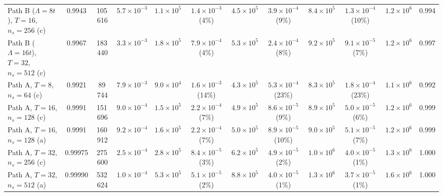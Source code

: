 \documentclass[a4paper,11pt,noarxiv]{quantumarticle}
\begin{document}
\begin{table}[t]
{\begin{tabular}{lcc|cc|cc|cc|ccc}
  Path B ($\Lambda=8t$), $T=16$, $n_s=256$ (c) & 0.9943 & 105\,616 & $5.7{\times}10^{-3}$ & $1.1{\times}10^{5}$ & $1.4{\times}10^{-3}$ (4\%) & $4.5{\times}10^{5}$ & $3.9{\times}10^{-4}$ (9\%) & $8.4{\times}10^{5}$ & $1.3{\times}10^{-4}$ (10\%) & $1.2{\times}10^{6}$ & 0.994\\
  Path B ($\Lambda=16t$), $T=32$, $n_s=512$ (c) & 0.9967 & 183\,440 & $3.3{\times}10^{-3}$ & $1.8{\times}10^{5}$ & $7.9{\times}10^{-4}$ (4\%) & $5.3{\times}10^{5}$ & $2.4{\times}10^{-4}$ (8\%) & $9.2{\times}10^{5}$ & $9.1{\times}10^{-5}$ (7\%) & $1.2{\times}10^{6}$ & 0.997\\
  Path A, $T=8$, $n_s=64$ (c) & 0.9921 & 89\,744 & $7.9{\times}10^{-3}$ & $9.0{\times}10^{4}$ & $1.6{\times}10^{-3}$ (14\%) & $4.3{\times}10^{5}$ & $5.3{\times}10^{-4}$ (23\%) & $8.3{\times}10^{5}$ & $1.8{\times}10^{-4}$ (23\%) & $1.1{\times}10^{6}$ & 0.992\\
  Path A, $T=16$, $n_s=128$ (c) & 0.9991 & 151\,696 & $9.0{\times}10^{-4}$ & $1.5{\times}10^{5}$ & $2.2{\times}10^{-4}$ (7\%) & $4.9{\times}10^{5}$ & $8.6{\times}10^{-5}$ (9\%) & $8.9{\times}10^{5}$ & $5.0{\times}10^{-5}$ (6\%) & $1.2{\times}10^{6}$ & 0.999\\
  Path A, $T=16$, $n_s=128$ (a) & 0.9991 & 160\,912 & $9.2{\times}10^{-4}$ & $1.6{\times}10^{5}$ & $2.2{\times}10^{-4}$ (7\%) & $5.0{\times}10^{5}$ & $8.9{\times}10^{-5}$ (10\%) & $9.0{\times}10^{5}$ & $5.1{\times}10^{-5}$ (7\%) & $1.2{\times}10^{6}$ & 0.999\\
  Path A, $T=32$, $n_s=256$ (c) & 0.99975 & 275\,600 & $2.5{\times}10^{-4}$ & $2.8{\times}10^{5}$ & $8.4{\times}10^{-5}$ (3\%) & $6.2{\times}10^{5}$ & $4.9{\times}10^{-5}$ (2\%) & $1.0{\times}10^{6}$ & $4.0{\times}10^{-5}$ (1\%) & $1.3{\times}10^{6}$ & 1.000\\
  Path A, $T=32$, $n_s=512$ (a) & 0.99990 & 532\,624 & $1.0{\times}10^{-4}$ & $5.3{\times}10^{5}$ & $5.1{\times}10^{-5}$ (2\%) & $8.8{\times}10^{5}$ & $4.0{\times}10^{-5}$ (1\%) & $1.3{\times}10^{6}$ & $3.7{\times}10^{-5}$ (1\%) & $1.6{\times}10^{6}$ & 1.000\\
  \bottomrule
  \end{tabular}}
\end{table}

\end{document}
